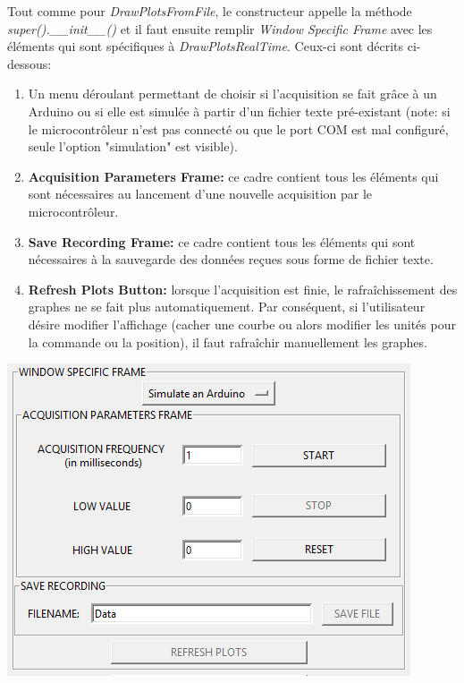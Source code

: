 Tout comme pour \textit{DrawPlotsFromFile}, le constructeur appelle la méthode \textit{super().\_\_init\_\_()} et il faut ensuite remplir \textit{Window Specific Frame} avec les éléments qui sont spécifiques à \textit{DrawPlotsRealTime}. Ceux-ci sont décrits ci-dessous:

\begin{enumerate}
    \item Un menu déroulant permettant de choisir si l'acquisition se fait grâce à un Arduino ou si elle est simulée à partir d'un fichier texte pré-existant (note: si le microcontrôleur n'est pas connecté ou que le port COM est mal configuré, seule l'option "simulation" est visible).
    \item \textbf{Acquisition Parameters Frame:} ce cadre contient tous les éléments qui sont nécessaires au lancement d'une nouvelle acquisition par le microcontrôleur.
    \item \textbf{Save Recording Frame:} ce cadre contient tous les éléments qui sont nécessaires à la sauvegarde des données reçues sous forme de fichier texte.
    \item \textbf{Refresh Plots Button:} lorsque l'acquisition est finie, le rafraîchissement des graphes ne se fait plus automatiquement. Par conséquent, si l'utilisateur désire modifier l'affichage (cacher une courbe ou alors modifier les unités pour la commande ou la position), il faut rafraîchir manuellement les graphes.
\end{enumerate}

\begin{center}
    \includegraphics[scale=0.7]{images/DrawPlotsRealTime-WindowSpecificFrame.png}
\end{center}

